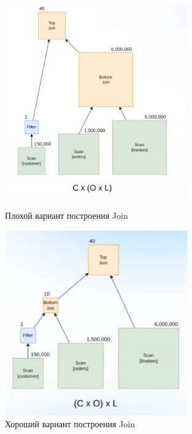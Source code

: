 \documentclass[11pt]{article}
\begin{document}
    \begin{figure}[h!]
        \begin{minipage}{0.5\textwidth}
            \centering
            \includegraphics*[width=0.7\textwidth]{Pictures/Problem/Bad variant}
            \caption{Плохой вариант построения Join}
        \end{minipage}
        \begin{minipage}{0.5\textwidth}
            \centering
            \includegraphics*[width=0.7\textwidth]{Pictures/Problem/Good variant}
            \caption{Хороший вариант построения Join}
        \end{minipage}
        \label{fig:join_problem_pictures}
    \end{figure}
\end{document}
